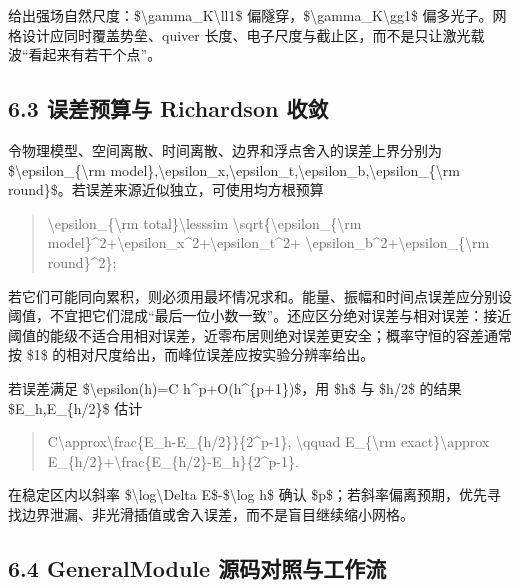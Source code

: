 \documentclass[UTF8,openany,11pt,fontset=fandol]{ctexbook}
\begin{document}
给出强场自然尺度：\$\textbackslash gamma\_K\textbackslash ll1\$
偏隧穿，\$\textbackslash gamma\_K\textbackslash gg1\$
偏多光子。网格设计应同时覆盖势垒、quiver
长度、电子尺度与截止区，而不是只让激光载波``看起来有若干个点''。

\subsection{\texorpdfstring{\textbf{6.3 误差预算与 Richardson
收敛}}{6.3 误差预算与 Richardson 收敛}}\label{ux8befux5deeux9884ux7b97ux4e0e-richardson-ux6536ux655b}

令物理模型、空间离散、时间离散、边界和浮点舍入的误差上界分别为
\$\textbackslash epsilon\_\{\textbackslash rm
model\},\textbackslash epsilon\_x,\textbackslash epsilon\_t,\textbackslash epsilon\_b,\textbackslash epsilon\_\{\textbackslash rm
round\}\$。若误差来源近似独立，可使用均方根预算

\begin{quote}
\textbackslash epsilon\_\{\textbackslash rm
total\}\textbackslash lesssim
\textbackslash sqrt\{\textbackslash epsilon\_\{\textbackslash rm
model\}\^{}2+\textbackslash epsilon\_x\^{}2+\textbackslash epsilon\_t\^{}2+
\textbackslash epsilon\_b\^{}2+\textbackslash epsilon\_\{\textbackslash rm
round\}\^{}2\};
\end{quote}

若它们可能同向累积，则必须用最坏情况求和。能量、振幅和时间点误差应分别设阈值，不宜把它们混成``最后一位小数一致''。还应区分绝对误差与相对误差：接近阈值的能级不适合用相对误差，近零布居则绝对误差更安全；概率守恒的容差通常按
\$1\$ 的相对尺度给出，而峰位误差应按实验分辨率给出。

若误差满足 \$\textbackslash epsilon(h)=C h\^{}p+O(h\^{}\{p+1\})\$，用
\$h\$ 与 \$h/2\$ 的结果 \$E\_h,E\_\{h/2\}\$ 估计

\begin{quote}
C\textbackslash approx\textbackslash frac\{E\_h-E\_\{h/2\}\}\{2\^{}p-1\},
\textbackslash qquad E\_\{\textbackslash rm exact\}\textbackslash approx
E\_\{h/2\}+\textbackslash frac\{E\_\{h/2\}-E\_h\}\{2\^{}p-1\}.
\end{quote}

在稳定区内以斜率 \$\textbackslash log\textbar\textbackslash Delta
E\textbar\$-\$\textbackslash log h\$ 确认
\$p\$；若斜率偏离预期，优先寻找边界泄漏、非光滑插值或舍入误差，而不是盲目继续缩小网格。

\subsection{\texorpdfstring{\textbf{6.4 GeneralModule
源码对照与工作流}}{6.4 GeneralModule 源码对照与工作流}}\label{generalmodule-ux6e90ux7801ux5bf9ux7167ux4e0eux5de5ux4f5cux6d41}
\end{document}
